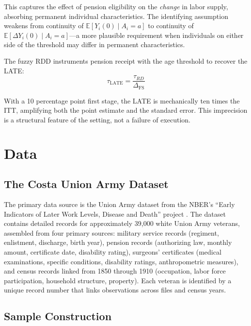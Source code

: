 \documentclass[12pt]{article}
\newcommand{\E}{\mathbb{E}}
\begin{document}
This captures the effect of pension eligibility on the \textit{change} in labor supply, absorbing permanent individual characteristics. The identifying assumption weakens from continuity of $\E[Y_i(0) \mid A_i = a]$ to continuity of $\E[\Delta Y_i(0) \mid A_i = a]$---a more plausible requirement when individuals on either side of the threshold may differ in permanent characteristics.

The fuzzy RDD instruments pension receipt with the age threshold to recover the LATE:
\begin{equation}
\tau_{\text{LATE}} = \frac{\tau_{RD}}{\Delta_{\text{FS}}}
\end{equation}

With a 10 percentage point first stage, the LATE is mechanically ten times the ITT, amplifying both the point estimate and the standard error. This imprecision is a structural feature of the setting, not a failure of execution.


\section{Data}

\subsection{The Costa Union Army Dataset}

The primary data source is the Union Army dataset from the NBER's ``Early Indicators of Later Work Levels, Disease and Death'' project \citep{fogel1993new, costa1995pensions}. The dataset contains detailed records for approximately 39,000 white Union Army veterans, assembled from four primary sources: military service records (regiment, enlistment, discharge, birth year), pension records (authorizing law, monthly amount, certificate date, disability rating), surgeons' certificates (medical examinations, specific conditions, disability ratings, anthropometric measures), and census records linked from 1850 through 1910 (occupation, labor force participation, household structure, property). Each veteran is identified by a unique record number that links observations across files and census years.

\subsection{Sample Construction}
\end{document}
